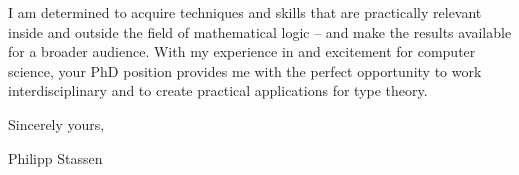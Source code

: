 \documentclass[10pt]{letter} %
\begin{document}
\begin{letter}{}
	I am determined to acquire techniques and skills that are practically relevant inside and outside the field of mathematical logic – and make the results available for a broader audience.
	With my experience in and excitement for computer science, 
your PhD position provides me with the perfect opportunity to work interdisciplinary and to create practical applications for type theory.


Sincerely yours,

\smallskip
Philipp Stassen

\vfill
{} %




\end{letter}
\end{document}
